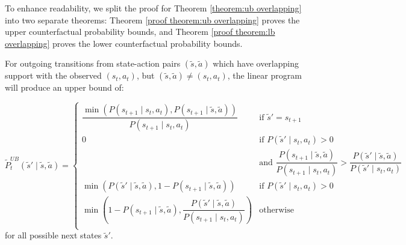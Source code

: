 To enhance readability, we split the proof for Theorem \ref{theorem:ub overlapping} into two separate theorems: Theorem \ref{proof theorem:ub overlapping} proves the upper counterfactual probability bounds, and Theorem \ref{proof theorem:lb overlapping} proves the lower counterfactual probability bounds.

\begin{theorem}
\label{proof theorem:ub overlapping}
For outgoing transitions from state-action pairs $(\tilde{s}, \tilde{a})$ which have overlapping support with the observed $(s_t, a_t)$, but $(\tilde{s}, \tilde{a}) \neq (s_t, a_t)$, the linear program will produce an upper bound of:

\[\tilde{P}_{t}^{UB}(\tilde{s}' \mid \tilde{s}, \tilde{a}) =
\begin{cases}
\dfrac{\min(P(s_{t+1} \mid s_t, a_t), P(s_{t+1} \mid \tilde{s}, \tilde{a}))}{P(s_{t+1} \mid s_t, a_t)} & \text{if $\tilde{s}' = s_{t+1}$}\\
0 & \text{if $P(\tilde{s}' \mid s_t, a_t) > 0$} \\ & \text{and $\dfrac{P(s_{t+1} \mid \tilde{s}, \tilde{a})}{P(s_{t+1} \mid s_t, a_t)}>\dfrac{P(\tilde{s}' \mid \tilde{s}, \tilde{a})}{P(\tilde{s}' \mid s_t, a_t)}$}\\
\min(P(\tilde{s}' \mid \tilde{s}, \tilde{a}), 1 - P(s_{t+1} \mid \tilde{s}, \tilde{a})) & \text{if $P(\tilde{s}' \mid s_t, a_t) > 0$}\\
\min(1 - P(s_{t+1} \mid \tilde{s}, \tilde{a}), \dfrac{P(\tilde{s}' \mid \tilde{s}, \tilde{a})}{P(s_{t+1} \mid s_t, a_t)}) & \text{otherwise}\\
\end{cases}
\]
for all possible next states $\tilde{s}'$.
\end{theorem}


